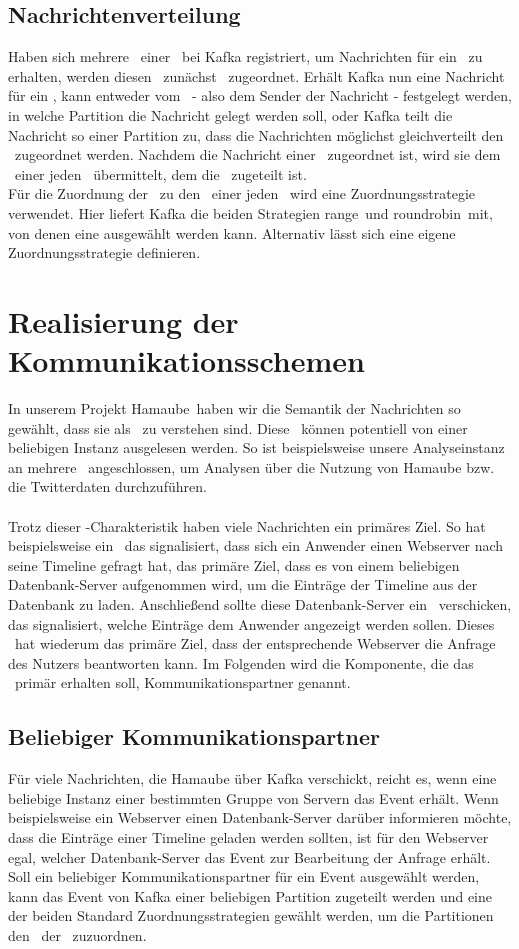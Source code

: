 \subsection{Nachrichtenverteilung}
Haben sich mehrere \C\ einer \CG\ bei Kafka registriert, um Nachrichten für ein \T\ zu erhalten, werden diesen \Cn\ zunächst \Pts\ zugeordnet. Erhält Kafka nun eine Nachricht für ein \T, kann entweder vom \Td\ - also dem Sender der Nachricht - festgelegt werden, in welche Partition die Nachricht gelegt werden soll, oder Kafka teilt die Nachricht so einer Partition zu, dass die Nachrichten möglichst gleichverteilt den \Tcs\ zugeordnet werden. Nachdem die Nachricht einer \Pt\ zugeordnet ist, wird sie dem \C\ einer jeden \CG\ übermittelt, dem die \Pt\ zugeteilt ist. \\
Für die Zuordnung der \Pts\ zu den \Cn\ einer jeden \CG\ wird eine Zuordnungsstrategie verwendet. Hier liefert Kafka die beiden Strategien \glqq range\grqq\ und \glqq roundrobin\grqq\ mit, von denen eine ausgewählt werden kann. Alternativ lässt sich eine eigene Zuordnungsstrategie definieren.
\section{Realisierung der Kommunikationsschemen}
In unserem Projekt \glqq Hamaube\grqq\ haben wir die Semantik der Nachrichten so gewählt, dass sie als \Evs\ zu verstehen sind. Diese \Evs\ können potentiell von einer beliebigen Instanz ausgelesen werden. So ist beispielsweise unsere Analyseinstanz an mehrere \Tcs\ angeschlossen, um Analysen über die Nutzung von Hamaube bzw. die Twitterdaten durchzuführen. \\
\\
Trotz dieser \Ev-Charakteristik haben viele Nachrichten ein primäres Ziel. So hat beispielsweise ein \Ev\, das signalisiert, dass sich ein Anwender einen Webserver nach seine Timeline gefragt hat, das primäre Ziel, dass es von einem beliebigen Datenbank-Server aufgenommen wird, um die Einträge der Timeline aus der Datenbank zu laden. Anschließend sollte diese Datenbank-Server ein \Ev\ verschicken, das signalisiert, welche Einträge dem Anwender angezeigt werden sollen. Dieses \Ev\ hat wiederum das primäre Ziel, dass der entsprechende Webserver die Anfrage des Nutzers beantworten kann. Im Folgenden wird die Komponente, die das \Ev\ primär erhalten soll, Kommunikationspartner genannt.
\subsection{Beliebiger Kommunikationspartner}
Für viele Nachrichten, die Hamaube über Kafka verschickt, reicht es, wenn eine beliebige Instanz einer bestimmten Gruppe von Servern das Event erhält. Wenn beispielsweise ein Webserver einen Datenbank-Server darüber informieren möchte, dass die Einträge einer Timeline geladen werden sollten, ist für den Webserver egal, welcher Datenbank-Server das Event zur Bearbeitung der Anfrage erhält.\\
Soll ein beliebiger Kommunikationspartner für ein Event ausgewählt werden, kann das Event von Kafka einer beliebigen Partition zugeteilt werden und eine der beiden Standard Zuordnungsstrategien gewählt werden, um die Partitionen den \Cn\ der \CG\ zuzuordnen.
